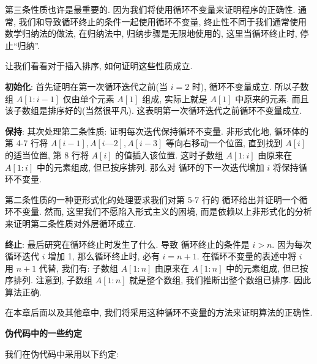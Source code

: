 \documentclass[oneside,10pt]{ctexbook}
\begin{document}
第三条性质也许是最重要的. 因为我们将使用循环不变量来证明程序的正确性. 通常, 我们和导致循环终止的条件一起使用循环不变量, 终止性不同于我们通常使用数学归纳法的做法, 在归纳法中, 归纳步骤是无限地使用的, 这里当循环终止时, 停止``归纳''.

让我们看看对于插入排序, 如何证明这些性质成立.

\textbf{初始化}: 首先证明在第一次循环迭代之前(当 $i=2$ 时), 循环不变量成立. 所以子数组 $A[1:i-1]$ 仅由单个元素 $A[1]$ 组成, 实际上就是 $A[1]$ 中原来的元素. 而且该子数组是排序好的(当然很平凡). 这表明第一次循环迭代之前循环不变量成立.

\textbf{保持}: 其次处理第二条性质: 证明每次迭代保持循环不变量. 非形式化地,  循环体的第 4-7 行将 $A[i-1], A[i—2], A[i-3]$ 等向右移动一个位置, 直到找到 $A[i]$ 的适当位置, 第 8 行将 $A[i]$ 的值插入该位置. 这时子数组 $A[1:i]$ 由原来在 $A[1:i]$ 中的元素组成, 但已按序排列. 那么对  循环的下一次迭代增加 $i$ 将保持循环不变量.

第二条性质的一种更形式化的处理要求我们对第 5-7 行的  循环给出并证明一个循环不变量. 然而, 这里我们不愿陷入形式主义的困境, 而是依赖以上非形式化的分析来证明第二条性质对外层循环成立.

\textbf{终止}: 最后研究在循环终止时发生了什么. 导致  循环终止的条件是 $i > n$. 因为每次循环迭代 $i$ 增加 1, 那么循环终止时, 必有 $i=n+1$. 在循环不变量的表述中将 $i$ 用 $n+1$ 代替, 我们有: 子数组 $A[1:n]$ 由原来在 $A[1:n]$ 中的元素组成, 但已按序排列. 注意到, 子数组 $A[1:n]$ 就是整个数组, 我们推断出整个数组已排序. 因此算法正确.

在本章后面以及其他章中, 我们将采用这种循环不变量的方法来证明算法的正确性.

\textbf{伪代码中的一些约定}

我们在伪代码中采用以下约定:
\end{document}
